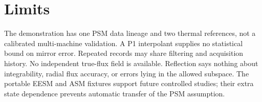 \section{Limits}
The demonstration has one PSM data lineage and two thermal references, not a
calibrated multi-machine validation. A P1 interpolant supplies no statistical
bound on mirror error. Repeated records may share filtering and acquisition
history. No independent true-flux field is available. Reflection says nothing
about integrability, radial flux accuracy, or errors lying in the allowed
subspace. The portable EESM and ASM fixtures support future controlled studies;
their extra state dependence prevents automatic transfer of the PSM assumption.
